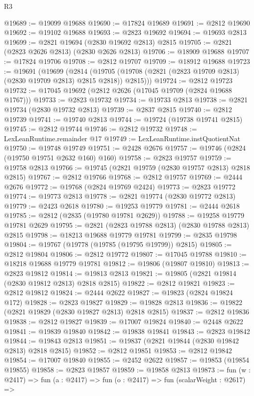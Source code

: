 \begin{lexlean}{R3}
\begin{coremodule}
@19689 := @19099 @19688
@19690 := @17824 @19689
@19691 := @2812 @19690
@19692 := @19102 @19688
@19693 := @2823 @19692
@19694 := @19693 @2813
@19699 := @2821 @19694 (@2830 @19692 @2813) @2815
@19705 := @2821 (@2823 @2626 @2813) (@2830 @2626 @2813)
@19706 := @18909 @19688
@19707 := @17824 @19706
@19708 := @2812 @19707
@19709 := @18912 @19688
@19723 := @19691
    (@19699
      (@2814 (@19705 (@19708 (@2821 (@2823 @19709 @2813) (@2830 @19709 @2813) @2815 @2818)) @2815)))
@19724 := @2812 @19723
@19732 := @17045 @19692 (@2812 @2626 (@17045 @19709 (@2824 @19688 @1767)))
@19733 := @2823 @19732
@19734 := @19733 @2813
@19738 := @2821 @19734 (@2830 @19732 @2813)
@19739 := @2837 @2815
@19740 := @2812 @19739
@19741 := @19740 @2813
@19744 := @19724 (@19738 @19741 @2815)
@19745 := @2812 @19744
@19746 := @2812 @19732
@19748 := LexLeanRuntime.remainder @17
@19749 := LexLeanRuntime.instQuotientNat
@19750 := @19748 @19749
@19751 := @2428 @2676
@19757 := @19746 (@2824 (@19750 @19751 @2632 @160) @160)
@19758 := @2823 @19757
@19759 := @19758 @2813
@19766 := @19745 (@2821 @19759 (@2830 @19757 @2813) @2818 @2815)
@19767 := @2812 @19766
@19768 := @2812 @19757
@19769 := @2444 @2676
@19772 := @19768 (@2824 @19769 @2424)
@19773 := @2823 @19772
@19774 := @19773 @2813
@19778 := @2821 @19774 (@2830 @19772 @2813)
@19779 := @2423 @2618
@19780 := @19253 @19779
@19781 := @2444 @2618
@19785 := @2812 (@2835 (@19780 @19781 @2629))
@19788 := @19258 @19779 @19781 @2629
@19795 := @2821 (@2823 @19788 @2813) (@2830 @19788 @2813) @2815
@19798 := @18213 @19688 @19779 @19781
@19799 := @2835 @19798
@19804 := @19767 (@19778 (@19785 (@19795 @19799)) @2815)
@19805 := @2812 @19804
@19806 := @2812 @19772
@19807 := @17045 @19788
@19810 := @18218 @19688 @19779 @19781
@19812 := @19806 (@19807 @19810)
@19813 := @2823 @19812
@19814 := @19813 @2813
@19821 := @19805 (@2821 @19814 (@2830 @19812 @2813) @2818 @2815)
@19822 := @2812 @19821
@19823 := @2812 @19812
@19824 := @2444 @2622
@19827 := @19823 (@2824 @19824 @172)
@19828 := @2823 @19827
@19829 := @19828 @2813
@19836 := @19822 (@2821 @19829 (@2830 @19827 @2813) @2818 @2815)
@19837 := @2812 @19836
@19838 := @2812 @19827
@19839 := @17007 @19824
@19840 := @2448 @2622
@19841 := @19839 @19840
@19842 := @19838 @19841
@19843 := @2823 @19842
@19844 := @19843 @2813
@19851 := @19837 (@2821 @19844 (@2830 @19842 @2813) @2818 @2815)
@19852 := @2812 @19851
@19853 := @2812 @19842
@19854 := @17007 @19840
@19855 := @2452 @2622
@19857 := @19853 (@19854 @19855)
@19858 := @2823 @19857
@19859 := @19858 @2813
@19873 := fun (w : @2417) =>
  fun (a : @2417) =>
  fun (o : @2417) =>
  fun (scalarWeight : @2617) =>

\end{coremodule}
\end{lexlean}
